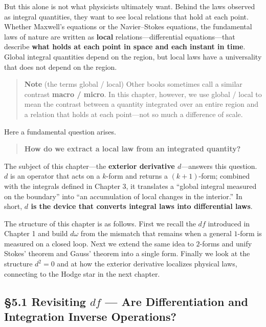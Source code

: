\documentclass[a4paper,12pt,openany]{book}
\begin{document}
But this alone is not what physicists ultimately want. Behind the laws
observed as integral quantities, they want to see local relations that
hold at each point. Whether Maxwell's equations or the Navier–Stokes
equations, the fundamental laws of nature are written as \textbf{local}
relations—differential equations—that describe
\textbf{what holds at each point in space and each instant in time}.
Global integral quantities depend on the region, but local laws have a
universality that does not depend on the region.

\begin{quote}
\textbf{Note} (the terms global / local) Other books sometimes call a
similar contrast \textbf{macro / micro}. In this chapter, however, we
use global / local to mean the contrast between a quantity integrated
over an entire region and a relation that holds at each point—not so
much a difference of scale.
\end{quote}

Here a fundamental question arises.

\begin{quote}
\textbf{How do we extract a local law from an integrated quantity?}
\end{quote}

The subject of this chapter—the
\textbf{exterior derivative $d$}—answers this question. \(d\) is an
operator that acts on a \(k\)-form and returns a \((k+1)\)-form;
combined with the integrals defined in Chapter 3, it translates a
``global integral measured on the boundary'' into ``an accumulation of
local changes in the interior.'' In short,
\textbf{$d$ is the device that converts integral laws into differential laws}.

The structure of this chapter is as follows. First we recall the \(df\)
introduced in Chapter 1 and build \(d\omega\) from the mismatch that
remains when a general \(1\)-form is measured on a closed loop. Next we
extend the same idea to \(2\)-forms and unify Stokes' theorem and Gauss'
theorem into a single form. Finally we look at the structure \(d^2=0\)
and at how the exterior derivative localizes physical laws, connecting
to the Hodge star in the next chapter.

\par\vspace{0.35em}\par

\hypertarget{revisiting-df-are-differentiation-and-integration-inverse-operations}{%
\subsection{\texorpdfstring{§5.1 Revisiting \(df\) — Are
Differentiation and Integration Inverse
Operations?}{§5.1 Revisiting df — Are Differentiation and Integration Inverse Operations?}}\label{revisiting-df-are-differentiation-and-integration-inverse-operations}}
\end{document}

